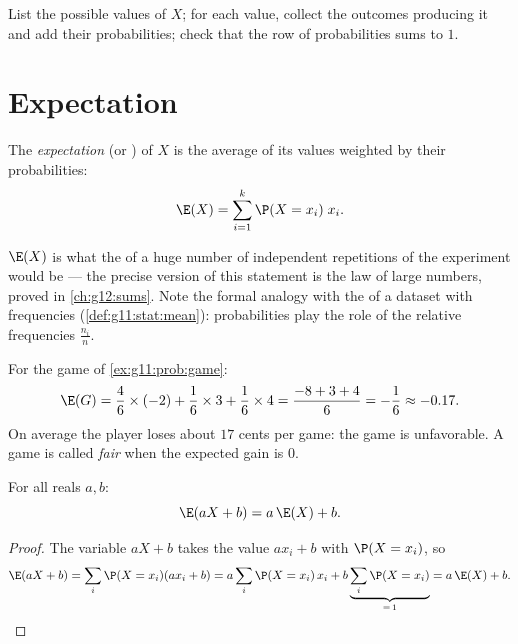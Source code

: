 \begin{method}\label{met:g11:prob:table}
List the possible values of $X$; for each value, collect the outcomes
producing it and add their probabilities; check that the row of
probabilities sums to $1$.
\end{method}

\section{Expectation}

\begin{definition}[Expectation]\label{def:g11:prob:expectation}
The \emph{expectation} (or ) of $X$ is the average
of its values weighted by their probabilities:
\[
\E(X) = \sum_{i=1}^{k} \P(X = x_i)\; x_i .
\]
\end{definition}

\begin{remark}
$\E(X)$ is what the  of a huge number of independent repetitions of
the experiment would be --- the precise version of this statement is the
law of large numbers, proved in \cref{ch:g12:sums}. Note the formal
analogy with the  of a dataset with frequencies
(\cref{def:g11:stat:mean}): probabilities play the role of the relative
frequencies $\frac{n_i}{n}$.
\end{remark}

\begin{example}\label{ex:g11:prob:gameexp}
For the game of \cref{ex:g11:prob:game}:
\[
\E(G) = \frac46 \times (-2) + \frac16 \times 3 + \frac16 \times 4
= \frac{-8 + 3 + 4}{6} = -\frac16 \approx -0.17 .
\]
On average the player loses about $17$ cents per game: the game is
unfavorable. A game is called \emph{fair} when the expected gain is $0$.
\end{example}

\begin{proposition}[Linearity]\label{prop:g11:prob:linearity}
For all reals $a, b$:
\[
\E(aX + b) = a\,\E(X) + b .
\]
\end{proposition}

\begin{proof}
The variable $aX + b$ takes the value $a x_i + b$ with 
$\P(X = x_i)$, so
\[
\E(aX + b) = \sum_i \P(X = x_i)(a x_i + b)
= a \sum_i \P(X = x_i)\,x_i + b \underbrace{\sum_i \P(X =
x_i)}_{=\,1} = a\,\E(X) + b .
\]
\end{proof}

